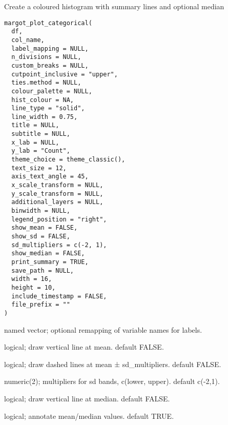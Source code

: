 \documentclass[a4paper]{book}
\begin{document}
%
\begin{Description}
Create a coloured histogram with summary lines and optional median
\end{Description}
%
\begin{Usage}
\begin{verbatim}
margot_plot_categorical(
  df,
  col_name,
  label_mapping = NULL,
  n_divisions = NULL,
  custom_breaks = NULL,
  cutpoint_inclusive = "upper",
  ties.method = NULL,
  colour_palette = NULL,
  hist_colour = NA,
  line_type = "solid",
  line_width = 0.75,
  title = NULL,
  subtitle = NULL,
  x_lab = NULL,
  y_lab = "Count",
  theme_choice = theme_classic(),
  text_size = 12,
  axis_text_angle = 45,
  x_scale_transform = NULL,
  y_scale_transform = NULL,
  additional_layers = NULL,
  binwidth = NULL,
  legend_position = "right",
  show_mean = FALSE,
  show_sd = FALSE,
  sd_multipliers = c(-2, 1),
  show_median = FALSE,
  print_summary = TRUE,
  save_path = NULL,
  width = 16,
  height = 10,
  include_timestamp = FALSE,
  file_prefix = ""
)
\end{verbatim}
\end{Usage}
%
\begin{Arguments}
\begin{ldescription}
\item[\code{label\_mapping}] named vector; optional remapping of variable names for labels.

\item[\code{show\_mean}] logical; draw vertical line at mean. default FALSE.

\item[\code{show\_sd}] logical; draw dashed lines at mean ± sd\_multipliers. default FALSE.

\item[\code{sd\_multipliers}] numeric(2); multipliers for sd bands, c(lower, upper). default c(-2,1).

\item[\code{show\_median}] logical; draw vertical line at median. default FALSE.

\item[\code{print\_summary}] logical; annotate mean/median values. default TRUE.
\end{ldescription}
\end{Arguments}
\end{document}
